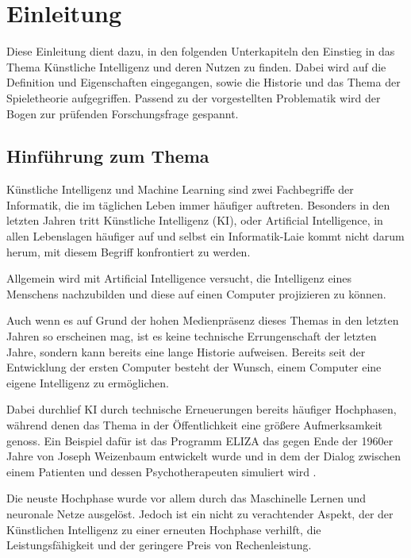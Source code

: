 
\chapter{Einleitung}
Diese Einleitung dient dazu, in den folgenden Unterkapiteln den Einstieg in das Thema Künstliche Intelligenz und deren Nutzen zu finden. Dabei wird auf die Definition und Eigenschaften eingegangen, sowie die Historie und das Thema der Spieletheorie aufgegriffen. Passend zu der vorgestellten Problematik wird der Bogen zur prüfenden Forschungsfrage gespannt.

\section{Hinführung zum Thema}
Künstliche Intelligenz und Machine Learning sind zwei Fachbegriffe der Informatik, die im täglichen Leben immer häufiger auftreten. Besonders in den letzten Jahren tritt Künstliche Intelligenz (\acs{KI}), oder Artificial Intelligence, in allen Lebenslagen häufiger auf und selbst ein Informatik-Laie kommt nicht darum herum, mit diesem Begriff konfrontiert zu werden. 

Allgemein wird mit Artificial Intelligence versucht, die Intelligenz eines Menschens nachzubilden und diese auf einen Computer projizieren zu können.

Auch wenn es auf Grund der hohen Medienpräsenz dieses Themas in den letzten Jahren so erscheinen mag, ist es keine technische Errungenschaft der letzten Jahre, sondern kann bereits eine lange Historie aufweisen. Bereits seit der Entwicklung der ersten Computer besteht der Wunsch, einem Computer eine eigene Intelligenz zu ermöglichen.

Dabei durchlief KI durch technische Erneuerungen bereits häufiger Hochphasen, während denen das Thema in der Öffentlichkeit eine größere Aufmerksamkeit genoss. Ein Beispiel dafür ist das Programm ELIZA das gegen Ende der 1960er Jahre von Joseph Weizenbaum entwickelt wurde und in dem der Dialog zwischen einem Patienten und dessen Psychotherapeuten simuliert wird \cite{Weizenbaum1966}.


Die neuste Hochphase wurde vor allem durch das Maschinelle Lernen und neuronale Netze ausgelöst. Jedoch ist ein nicht zu verachtender Aspekt, der der Künstlichen Intelligenz zu einer erneuten Hochphase verhilft, die Leistungsfähigkeit und der geringere Preis von Rechenleistung. 

